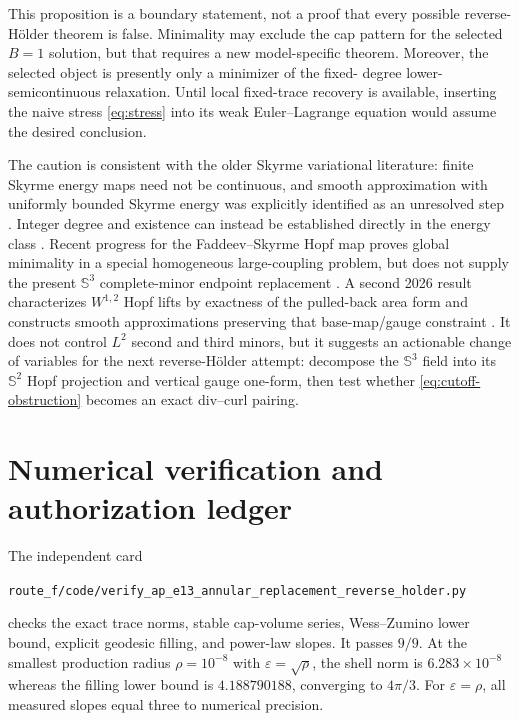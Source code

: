 \documentclass[11pt]{article}
\newcommand{\SSS}{\mathbb S}
\begin{document}
This proposition is a boundary statement, not a proof that every possible
reverse-H\"older theorem is false.  Minimality may exclude the cap pattern for
the selected $B=1$ solution, but that requires a new model-specific theorem.
Moreover, the selected object is presently only a minimizer of the fixed-
degree lower-semicontinuous relaxation.  Until local fixed-trace recovery is
available, inserting the naive stress \eqref{eq:stress} into its weak
Euler--Lagrange equation would assume the desired conclusion.

The caution is consistent with the older Skyrme variational literature:
finite Skyrme energy maps need not be continuous, and smooth approximation
with uniformly bounded Skyrme energy was explicitly identified as an
unresolved step \cite{AucklyKapitanski2003}.  Integer degree and existence can
instead be established directly in the energy class \cite{EstebanMuller1992}.
Recent progress for the Faddeev--Skyrme Hopf map proves global minimality in
a special homogeneous large-coupling problem, but does not supply the
present $\SSS^3$ complete-minor endpoint replacement
\cite{GuerraLamyZemas2026}.
A second 2026 result characterizes $W^{1,2}$ Hopf lifts by exactness of the
pulled-back area form and constructs smooth approximations preserving that
base-map/gauge constraint \cite{GuerraLamyZemasLifting2026}.  It does not
control $L^2$ second and third minors, but it suggests an actionable change of
variables for the next reverse-H\"older attempt: decompose the $\SSS^3$ field
into its $\SSS^2$ Hopf projection and vertical gauge one-form, then test
whether \eqref{eq:cutoff-obstruction} becomes an exact div--curl pairing.

\section{Numerical verification and authorization ledger}

The independent card
\begin{center}
\texttt{route\_f/code/verify\_ap\_e13\_annular\_replacement\_reverse\_holder.py}
\end{center}
checks the exact trace norms, stable cap-volume series, Wess--Zumino lower
bound, explicit geodesic filling, and power-law slopes.  It passes $9/9$.
At the smallest production radius $\rho=10^{-8}$ with
$\varepsilon=\sqrt\rho$, the shell norm is $6.283\times10^{-8}$ whereas the
filling lower bound is $4.188790188$, converging to $4\pi/3$.  For
$\varepsilon=\rho$, all measured slopes equal three to numerical precision.
\end{document}

